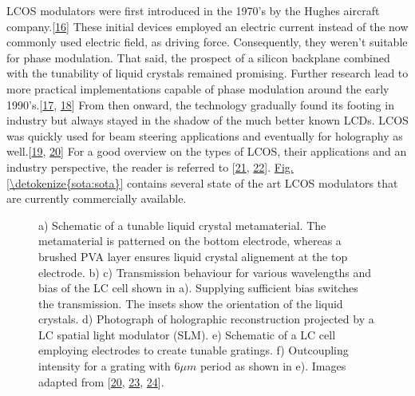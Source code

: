 \documentclass[a4paper,10pt,english,openany,oneside]{jupyterBook}
\begin{document}
\sphinxAtStartPar
LCOS modulators were first introduced in the 1970’s by the Hughes aircraft company.{[}\hyperlink{cite.bib:id271}{16}{]} These initial devices employed an electric current instead of the now commonly used electric field, as driving force. Consequently, they weren’t suitable for phase modulation. That said, the prospect of a silicon backplane combined with the tunability of liquid crystals remained promising. Further research lead to more practical implementations capable of phase modulation around the early 1990’s.{[}\hyperlink{cite.bib:id177}{17}, \hyperlink{cite.bib:id393}{18}{]} From then onward, the technology gradually found its footing in industry but always stayed in the shadow of the much better known LCDs. LCOS was quickly used for beam steering applications and eventually for holography as well.{[}\hyperlink{cite.bib:id218}{19}, \hyperlink{cite.bib:id188}{20}{]} For a good overview on the types of LCOS, their applications and an industry perspective, the reader is referred to {[}\hyperlink{cite.bib:id270}{21}, \hyperlink{cite.bib:id191}{22}{]}. \hyperref[\detokenize{sota:sota}]{Fig.\@ \ref{\detokenize{sota:sota}}} contains several state of the art LCOS modulators that are currently commercially available.

\begin{figure}[htbp]
\centering
\capstart

\noindent{}
\caption{a) Schematic of a tunable liquid crystal metamaterial. The metamaterial is patterned on the bottom electrode, whereas a brushed PVA layer ensures liquid crystal alignement at the top electrode. b) \sphinxhyphen{} c) Transmission behaviour for various wavelengths and bias of the LC cell shown in a). Supplying sufficient bias switches the transmission. The insets show the orientation of the liquid crystals. d) Photograph of holographic reconstruction projected by a LC spatial light modulator (SLM). e) Schematic of a LC cell employing electrodes to create tunable gratings. f) Outcoupling intensity for a grating with \(6\mu m\) period as shown in e). Images adapted from {[}\hyperlink{cite.bib:id188}{20}, \hyperlink{cite.bib:id165}{23}, \hyperlink{cite.bib:id143}{24}{]}.}\label{\detokenize{sota:chapter2-image11}}\end{figure}
\end{document}
